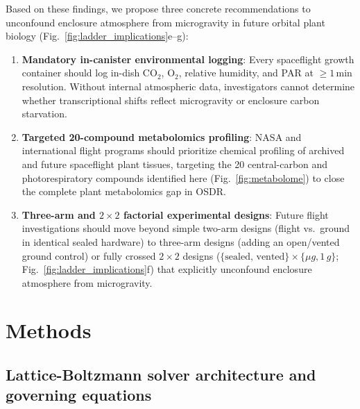\documentclass[10pt,twocolumn,a4paper]{article}
\begin{document}
Based on these findings, we propose three concrete recommendations to unconfound enclosure atmosphere from microgravity in future orbital plant biology (Fig.~\ref{fig:ladder_implications}e--g):
\begin{enumerate}
    \item \textbf{Mandatory in-canister environmental logging}: Every spaceflight growth container should log in-dish $\mathrm{CO_2}$, $\mathrm{O_2}$, relative humidity, and PAR at $\ge 1\,\mathrm{min}$ resolution. Without internal atmospheric data, investigators cannot determine whether transcriptional shifts reflect microgravity or enclosure carbon starvation.
    \item \textbf{Targeted 20-compound metabolomics profiling}: NASA and international flight programs should prioritize chemical profiling of archived and future spaceflight plant tissues, targeting the 20 central-carbon and photorespiratory compounds identified here (Fig.~\ref{fig:metabolome}) to close the complete plant metabolomics gap in OSDR.
    \item \textbf{Three-arm and $2\times 2$ factorial experimental designs}: Future flight investigations should move beyond simple two-arm designs (flight vs.\ ground in identical sealed hardware) to three-arm designs (adding an open/vented ground control) or fully crossed $2\times 2$ designs ($\{\text{sealed, vented}\} \times \{\mu g, 1\,g\}$; Fig.~\ref{fig:ladder_implications}f) that explicitly unconfound enclosure atmosphere from microgravity.
\end{enumerate}

\section*{Methods}\label{sec:methods}

\subsection*{Lattice-Boltzmann solver architecture and governing equations}
\end{document}
